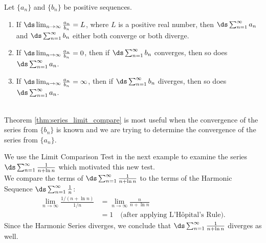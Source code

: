 {Let $\{a_n\}$ and $\{b_n\}$ be positive sequences.
	\begin{enumerate}
		\item If $\ds\lim_{n\to\infty} \frac{a_n}{b_n} = L$, where $L$ is a positive real number, then $\ds \sum_{n=1}^\infty a_n$ and $\ds \sum_{n=1}^\infty b_n$ either both converge or both diverge.
		\item	If $\ds\lim_{n\to\infty} \frac{a_n}{b_n} = 0$, then if $\ds \sum_{n=1}^\infty b_n$ converges, then so does $\ds \sum_{n=1}^\infty a_n$.
		\item	If $\ds\lim_{n\to\infty} \frac{a_n}{b_n} = \infty$, then if $\ds \sum_{n=1}^\infty b_n$ diverges, then so does $\ds \sum_{n=1}^\infty a_n$.
	\end{enumerate}
}\\


Theorem \ref{thm:series_limit_compare} is most useful when the convergence of the series from $\{b_n\}$ is known and we are trying to determine the convergence of the series from $\{a_n\}$. 

We use the Limit Comparison Test in the next example to examine the series $\ds\sum_{n=1}^\infty \frac1{n+\ln n}$ which motivated this new test.\\

{We compare the terms of $\ds\sum_{n=1}^\infty \frac1{n+\ln n}$ to the terms of the Harmonic Sequence $\ds\sum_{n=1}^\infty \frac1{n}$:
\begin{align*}
\lim_{n\to\infty}\frac{1/(n+\ln n)}{1/n} &= \lim_{n\to\infty} \frac{n}{n+\ln n} \\
			&= 1\quad \text{(after applying L'H\^opital's Rule)}.
\end{align*}
Since the Harmonic Series diverges, we conclude that $\ds\sum_{n=1}^\infty \frac1{n+\ln n}$ diverges as well.
}\\

